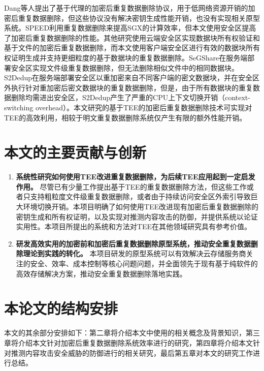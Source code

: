 Dang等人\cite{dang2017Privacy}提出了基于代理的加密后重复数据删除协议，用于低网络资源开销的加密后重复数据删除，但这些协议没有解决密钥生成性能开销，也没有实现相关原型系统。SPEED\cite{cui2019SPEED}利用重复数据删除来提高SGX的计算效率，但本文使用安全区提高了加密后重复数据删除的性能。其他研究使用云端安全区实现数据块所有权验证\cite{you2020Proofs}和基于文件的加密后重复数据删除\cite{fuhry20}，而本文使用客户端安全区进行有效的数据块所有权证明生成并支持更细粒度的基于数据块的重复数据删除。SeGShare\cite{fuhry2020segshare}在服务端部署安全区实现文件级重复数据删除，但无法删除相似文件中的相同数据块。S2Dedup\cite{miranda2021S2Dedup}在服务端部署安全区以重加密来自不同客户端的密文数据块，并在安全区外执行针对重加密后密文数据块的重复数据删除，但是，由于所有数据块的重复数据删除均需进出安全区，S2Dedup产生了严重的CPU上下文切换开销（context-switching overhead）\cite{weisse2017regaining}。本文研究的基于TEE的加密后重复数据删除技术可实现对TEE的高效利用，相较于明文重复数据删除系统仅产生有限的额外性能开销。

\section{本文的主要贡献与创新}

\begin{enumerate}[leftmargin=*]
    \item \textbf{系统性研究如何使用TEE改进重复数据删除，为后续TEE应用起到一定启发作用。}
    尽管已有少量工作提出基于TEE的重复数据删除方法，但这些工作或者只支持粗粒度文件级重复数据删除\cite{fuhry2020segshare}，或者由于持续访问安全区外索引导致巨大环境切换开销\cite{miranda2021S2Dedup}。本项目明确了如何使用TEE改进现有加密后重复数据删除的密钥生成和所有权证明，以及实现对推测内容攻击的防御，并提供系统以论证实用性。本项目所提出的系统和方法对TEE在其他领域研究具有参考价值。
    \item \textbf{研发高效实用的加密前和加密后重复数据删除原型系统，推动安全重复数据删除理论到实践的转化。}
    本项目研发的原型系统可以有效解决云存储服务商关注的安全、效率、成本控制等核心问题问题，并全面领先于现有基于纯软件的高效存储解决方案，推动安全重复数据删除落地实践。
\end{enumerate}

\section{本论文的结构安排}

本文的其余部分安排如下：第二章将介绍本文中使用的相关概念及背景知识，第三章将介绍本文针对加密后重复数据删除系统效率进行的研究，第四章将介绍本文针对推测内容攻击安全威胁的防御进行的相关研究，最后第五章对本文的研究工作进行总结。